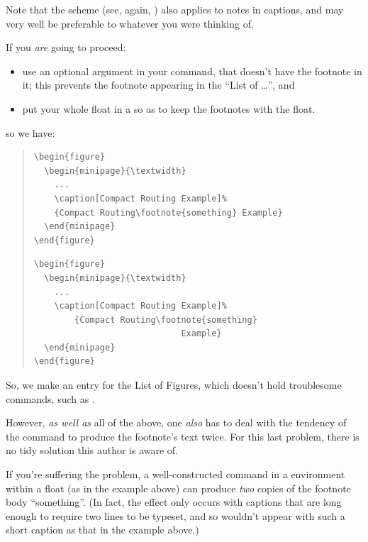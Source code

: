 Note that the  scheme (see, again, %
) also applies
to notes in captions, and may very well be preferable to whatever you
were thinking of.

If you \emph{are} going to proceed:
\begin{itemize}
\item use an optional argument in your  command, that
  doesn't have the footnote in it; this prevents the footnote
  appearing in the ``List of \dots{}'', and
\item put your whole float in a  so as to keep
  the footnotes with the float.
\end{itemize}
so we have:
\begin{quote}
\begin{wideversion}
\begin{verbatim}
\begin{figure}
  \begin{minipage}{\textwidth}
    ...
    \caption[Compact Routing Example]%
    {Compact Routing\footnote{something} Example}
  \end{minipage}
\end{figure}
\end{verbatim}
\end{wideversion}
\begin{narrowversion}
\begin{verbatim}
\begin{figure}
  \begin{minipage}{\textwidth}
    ...
    \caption[Compact Routing Example]%
        {Compact Routing\footnote{something}
                             Example}
  \end{minipage}
\end{figure}
\end{verbatim}
\end{narrowversion}
\end{quote}
So, we make an entry for the List of Figures, which doesn't hold
troublesome commands, such as .

However, \emph{as well as} all of the above, one \emph{also} has to
deal with the tendency of the  command to produce the
footnote's text twice.  For this last problem, there is no tidy
solution this author is aware of.

If you're suffering the problem, a well-constructed 
command in a  environment within a float (as
in the example above) can produce \emph{two} copies of the footnote
body ``something''. (In fact, the effect only occurs with captions that are
long enough to require two lines to be typeset, and so wouldn't appear
with such a short caption as that in the example above.)


